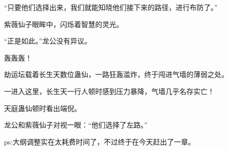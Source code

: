 \begin{this_body}
“只要他们选择出来，我们就能知晓他们接下来的路径，进行布防了。”

紫薇仙子眼眸中，闪烁着智慧的灵光。

“正是如此。”龙公没有异议。

轰轰轰！

劫运坛载着长生天数位蛊仙，一路狂轰滥炸，终于闯进气墙的薄弱之处。

一进入这里，长生天一行人顿时感到压力暴降，气墙几乎名存实亡！

天庭蛊仙顿时看出端倪。

龙公和紫薇仙子对视一眼：“他们选择了左路。”

ps:大纲调整实在太耗费时间了，不过终于在今天赶出了一章。

\end{this_body}

